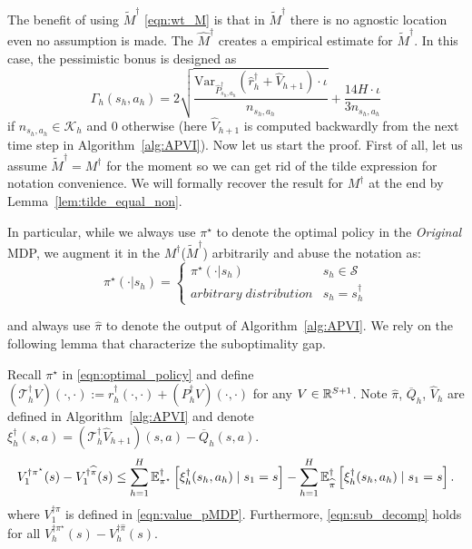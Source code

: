 The benefit of using $\widetilde{M}^\dagger$ \eqref{eqn:wt_M} is that in $\widetilde{M}^\dagger$ there is no agnostic location even no assumption is made.  The $\widehat{M}^\dagger$ creates a empirical estimate for $\widetilde{M}^\dagger$. In this case, the pessimistic bonus is designed as 
 \[
 \Gamma_h(s_h,a_h)=2\sqrt{\frac{\mathrm{Var}_{\widehat{P}^\dagger_{s_h,a_h}}(\widehat{r}^\dagger_h+\widehat{V}_{h+1})\cdot\iota}{n_{s_h,a_h}}}+\frac{14H\cdot\iota}{3n_{s_h,a_h}}
 \]
  if $n_{s_h,a_h}\in\mathcal{K}_h$ and $0$ otherwise (here $\widehat{V}_{h+1}$ is computed backwardly from the next time step in Algorithm~\ref{alg:APVI}). Now let us start the proof. First of all, let us assume $\widetilde{M}^\dagger=M^\dagger$ for the moment so we can get rid of the tilde expression for notation convenience. We will formally recover the result for $M^\dagger$ at the end by Lemma~\ref{lem:tilde_equal_non}. 
  
  In particular, while we always use $\pi^\star$ to denote the optimal policy in the \emph{Original} MDP, we augment it in the $M^\dagger$($\widetilde{M}^\dagger$) arbitrarily and abuse the notation as:
  \begin{equation}\label{eqn:optimal_policy}
 \pi^\star( \cdot |s_h)=\left\{\begin{array}{ll}
  \pi^\star( \cdot |s_h) & s_h \in \mathcal{S} \\
   arbitrary\;distribution& s_h=s^{\dagger}_{h} 
  \end{array}\right.
  \end{equation}
  
  and always use $\widehat{\pi}$ to denote the output of Algorithm~\ref{alg:APVI}. We rely on the following lemma that characterize the suboptimality gap.

\begin{lemma}\label{lem:sub_gap}

Recall $\pi^\star$ in \eqref{eqn:optimal_policy} and define $(\mathcal{T}^\dagger_{h} V)(\cdot,\cdot):=r_h^\dagger(\cdot,\cdot)+(P_h^\dagger V)(\cdot,\cdot)$ for any $V\in\mathbb{R}^{S+1}$. Note $\widehat{\pi}$, $\overline{Q}_h$, $\widehat{V}_h$ are defined in Algorithm~\ref{alg:APVI} and denote $\xi^\dagger_h(s,a)=(\mathcal{T}^\dagger_h\widehat{V}_{h+1})(s,a)-\overline{Q}_h(s,a)$.  
\begin{equation}\label{eqn:sub_decomp}
V_1^{\dagger\pi^\star}(s)-V_1^{\dagger\widehat{\pi}}(s)\leq \sum_{h=1}^H\mathbb{E}^\dagger_{\pi^\star}\left[\xi^\dagger_h(s_h,a_h)\mid s_1=s\right]-\sum_{h=1}^H\mathbb{E}^\dagger_{\widehat{\pi}}\left[\xi^\dagger_h(s_h,a_h)\mid s_1=s\right].
\end{equation}
where $V_1^{\dagger\pi}$ is defined in \eqref{eqn:value_pMDP}. Furthermore, \eqref{eqn:sub_decomp} holds for all $V_h^{\dagger\pi^\star}(s)-V_h^{\dagger\widehat{\pi}}(s)$.
\end{lemma}

